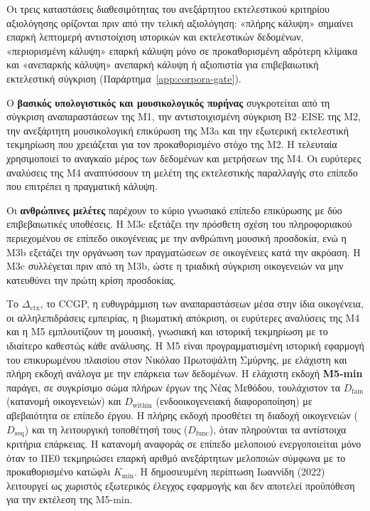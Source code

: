 \documentclass[11pt,a4paper]{article}
\begin{document}
Οι τρεις καταστάσεις διαθεσιμότητας του ανεξάρτητου εκτελεστικού κριτηρίου αξιολόγησης ορίζονται πριν από την τελική αξιολόγηση: «πλήρης κάλυψη» σημαίνει επαρκή λεπτομερή αντιστοίχιση ιστορικών και εκτελεστικών δεδομένων, «περιορισμένη κάλυψη» επαρκή κάλυψη μόνο σε προκαθορισμένη αδρότερη κλίμακα και «ανεπαρκής κάλυψη» ανεπαρκή κάλυψη ή αξιοπιστία για επιβεβαιωτική εκτελεστική σύγκριση (Παράρτημα~\ref{app:corpora-gate}).

Ο \textbf{βασικός υπολογιστικός και μουσικολογικός πυρήνας} συγκροτείται από τη σύγκριση αναπαραστάσεων της M1, την αντιστοιχισμένη σύγκριση B2--EISE της M2, την ανεξάρτητη μουσικολογική επικύρωση της M3a και την εξωτερική εκτελεστική τεκμηρίωση που χρειάζεται για τον προκαθορισμένο στόχο της M2. Η τελευταία χρησιμοποιεί το αναγκαίο μέρος των δεδομένων και μετρήσεων της M4. Οι ευρύτερες αναλύσεις της M4 αναπτύσσουν τη μελέτη της εκτελεστικής παραλλαγής στο επίπεδο που επιτρέπει η πραγματική κάλυψη.

Οι \textbf{ανθρώπινες μελέτες} παρέχουν το κύριο γνωσιακό επίπεδο επικύρωσης με δύο επιβεβαιωτικές υποθέσεις. Η M3c εξετάζει την πρόσθετη σχέση του πληροφοριακού περιεχομένου σε επίπεδο οικογένειας με την ανθρώπινη μουσική προσδοκία, ενώ η M3b εξετάζει την οργάνωση των πραγματώσεων σε οικογένειες κατά την ακρόαση. Η M3c συλλέγεται πριν από τη M3b, ώστε η τριαδική σύγκριση οικογενειών να μην κατευθύνει την πρώτη κρίση προσδοκίας.

Το $\Delta_{\mathrm{ctx}}$, το CCGP, η ευθυγράμμιση των αναπαραστάσεων μέσα στην ίδια οικογένεια, οι αλληλεπιδράσεις εμπειρίας, η βιωματική απόκριση, οι ευρύτερες αναλύσεις της M4 και η M5 εμπλουτίζουν τη μουσική, γνωσιακή και ιστορική τεκμηρίωση με το ιδιαίτερο καθεστώς κάθε ανάλυσης. Η M5 είναι προγραμματισμένη ιστορική εφαρμογή του επικυρωμένου πλαισίου στον Νικόλαο Πρωτοψάλτη Σμύρνης, με ελάχιστη και πλήρη εκδοχή ανάλογα με την επάρκεια των δεδομένων. Η ελάχιστη εκδοχή \textbf{M5-min} παράγει, σε συγκρίσιμο σώμα πλήρων έργων της Νέας Μεθόδου, τουλάχιστον τα $D_{\mathrm{fam}}$ (κατανομή οικογενειών) και $D_{\mathrm{within}}$ (ενδοοικογενειακή διαφοροποίηση) με αβεβαιότητα σε επίπεδο έργου. Η πλήρης εκδοχή προσθέτει τη διαδοχή οικογενειών ($D_{\mathrm{seq}}$) και τη λειτουργική τοποθέτησή τους ($D_{\mathrm{func}}$), όταν πληρούνται τα αντίστοιχα κριτήρια επάρκειας. Η κατανομή αναφοράς σε επίπεδο μελοποιού ενεργοποιείται μόνο όταν το ΠΕ0 τεκμηριώσει επαρκή αριθμό ανεξάρτητων μελοποιών σύμφωνα με το προκαθορισμένο κατώφλι $K_{\min}$. Η δημοσιευμένη περίπτωση Ιωαννίδη (2022) λειτουργεί ως χωριστός εξωτερικός έλεγχος εφαρμογής και δεν αποτελεί προϋπόθεση για την εκτέλεση της M5-min.
\end{document}
